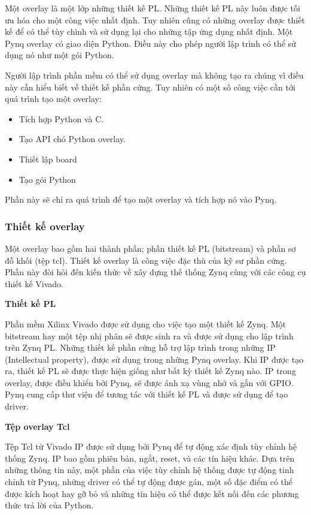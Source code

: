 		Một overlay là một lớp những thiết kế PL. Những thiết kế PL này luôn được tối ưu hóa cho một công việc nhất định. Tuy nhiên cũng có những overlay được thiết kế để có thể tùy chình và sử dụng lại cho những tập ứng dụng nhất định. Một Pynq overlay có giao diện Python. Điều này cho phép người lập trình có thể sử dụng nó như một gói Python.

		Người lập trình phần mềm có thể sử dụng overlay mà không tạo ra chúng vì điều này cần hiểu biết về thiết kế phần cứng. Tuy nhiên có một số công việc cần tới quá trình tạo một overlay:
		\begin{itemize}
			\item Tích hợp Python và C.
			\item Tạo API chó Python overlay.
			\item Thiết lập board
			\item Tạo gói Python
		\end{itemize}

		Phần này sẽ chỉ ra quá trình để tạo một overlay và tích hợp nó vào Pynq.

		\subsubsection{Thiết kế overlay} 
		Một overlay bao gồm hai thành phần; phần thiết kế PL (bitstream) và phần sơ đồ khối (tệp tcl). Thiết kế overlay là công việc đặc thù của kỹ sư phần cứng. Phần này đòi hỏi đến kiến thức về xây dựng thế thống Zynq cùng với các công cụ thiết kế Vivado.

		\textbf{Thiết kế PL}

		Phần mềm Xilinx Vivado được sử dụng cho việc tạo một thiết kế Zynq. Một bitstream hay một tệp nhị phân sẽ được sinh ra và được sử dụng cho lập trình trên Zynq PL.
		Những thiết kế phần cứng hỗ trợ lập trình trong những IP (Intellectual property), được sử dụng trong những Pynq overlay. Khi IP được tạo ra, thiết kế PL sẽ được thực hiện giống như bất kỳ thiết kế Zynq nào. IP trong overlay, được điều khiển bởi Pynq, sẽ được ánh xạ vùng nhớ và gắn với GPIO. Pynq cung cấp thư viện để tương tác với thiết kế PL và được sử dụng để tạo driver.

		\textbf{Tệp overlay Tcl}
		
		Tệp Tcl từ Vivado IP được sử dụng bởi Pynq để tự động xác định tùy chỉnh hệ thống Zynq. IP bao gồm phiên bản, ngắt, reset, và các tín hiệu khác. Dựa trên những thông tin này, một phần của việc tùy chỉnh hệ thống được tự động tinh chỉnh từ Pynq, những driver có thể tự động được gán, một số đặc điểm có thể được kích hoạt hay gỡ bỏ và những tín hiệu có thể được kết nối đến các phương thức trả lời của Python.

